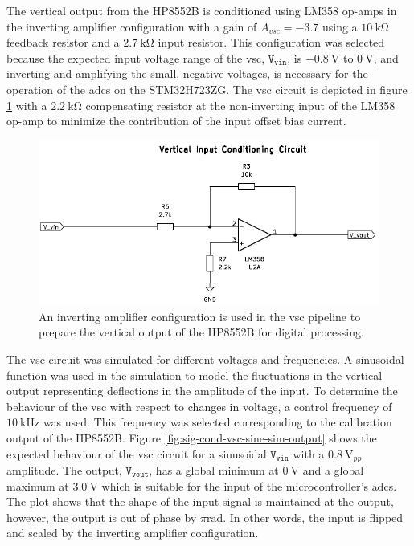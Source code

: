 \documentclass[class=report,11pt,crop=false]{standalone}
\begin{document}
	The vertical output from the HP8552B is conditioned using LM358 op-amps in the inverting amplifier configuration with a gain of $A_{vsc} = -3.7$ using a $\SI{10}{\kilo\ohm}$ feedback resistor and a $\SI{2.7}{\kilo\ohm}$ input resistor. This configuration was selected because the expected input voltage range of the \acrlong{vsc}, $\texttt{V}_\texttt{vin}$, is $-\SI{0.8}{\volt}$ to $\SI{0}{\volt}$, and inverting and amplifying the small, negative voltages, is necessary for the operation of the \acrshort{adc}s on the STM32H723ZG. The \acrshort{vsc} circuit is depicted in figure \ref{fig:sig-cond-vsc-schematic} with a $\SI{2.2}{\kilo\ohm}$ compensating resistor at the non-inverting input of the LM358 op-amp to minimize the contribution of the input offset bias current.
	
	\begin{figure}[h!]
		\centering
		\includegraphics[width=0.7\linewidth]{Figures/Methodology/sig-cond-vsc-schematic}
		\caption{An inverting amplifier configuration is used in the \acrshort{vsc} pipeline to prepare the vertical output of the HP8552B for digital processing.}
		\label{fig:sig-cond-vsc-schematic}
	\end{figure}
	
	The \acrshort{vsc} circuit was simulated for different voltages and frequencies. A sinusoidal function was used in the simulation to model the fluctuations in the vertical output representing deflections in the amplitude of the input. To determine the behaviour of the \acrshort{vsc} with respect to changes in voltage, a control frequency of $\SI{10}{\kilo\hertz}$ was used. This frequency was selected corresponding to the calibration output of the HP8552B. Figure \ref{fig:sig-cond-vsc-sine-sim-output} shows the expected behaviour of the \acrshort{vsc} circuit for a sinusoidal $\texttt{V}_\texttt{vin}$ with a $\SI{0.8}{\volt}_{pp}$ amplitude. The output, $\texttt{V}_\texttt{vout}$, has a global minimum at $\SI{0}{\volt}$ and a global maximum at $\SI{3.0}{\volt}$ which is suitable for the input of the microcontroller's \acrshort{adc}s. The plot shows that the shape of the input signal is maintained at the output, however, the output is out of phase by $\pi\si{\radian}$. In other words, the input is flipped and scaled by the inverting amplifier configuration. 
	
\end{document}
